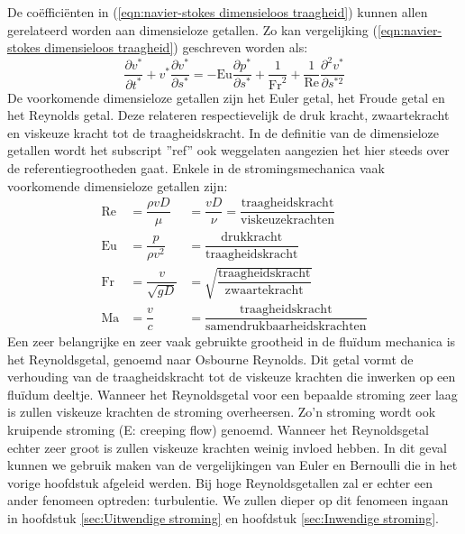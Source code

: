 De coëfficiënten in (\ref{eqn:navier-stokes dimensieloos traagheid}) kunnen allen gerelateerd worden aan dimensieloze getallen. Zo kan vergelijking (\ref{eqn:navier-stokes dimensieloos traagheid}) geschreven worden als:
\begin{equation}
	\frac{\partial v^*}{\partial t^*} + v^* \frac{\partial v^*}{\partial s^*} =  -\text{Eu} \frac{\partial p^*}{\partial s^*} + \frac{1}{\text{Fr}^2} + \frac{1}{\text{Re}} \frac{\partial^2 v^*}{\partial s^{*2}}
	\label{eqn:navier-stokes dimensieloze getallen}
\end{equation}
De voorkomende dimensieloze getallen zijn het Euler getal, het Froude getal en het Reynolds getal. Deze relateren respectievelijk de druk kracht, zwaartekracht en viskeuze kracht tot de traagheidskracht. In de definitie van de dimensieloze getallen wordt het subscript ''ref'' ook weggelaten aangezien het hier steeds over de referentiegrootheden gaat. Enkele in de stromingsmechanica vaak voorkomende dimensieloze getallen zijn:
\begin{align}
	\mathrm{Re} &= \dfrac{\rho v D}{\mu} &= \dfrac{v D}{\nu} = \dfrac{\mathrm{traagheidskracht}}{\mathrm{viskeuze krachten}} \label{eqn:Reynolds} \\
	\mathrm{Eu} &= \dfrac{p}{\rho v^2}   &= \dfrac{\mathrm{drukkracht}}{\mathrm{traagheidskracht}} \label{eqn:Euler} \\
	\mathrm{Fr} &= \dfrac{v}{\sqrt{g D}} &= \sqrt{\dfrac{\mathrm{traagheidskracht}}{\mathrm{zwaartekracht}}} \\
	\mathrm{Ma} &= \dfrac{v}{c}          &= \dfrac{\mathrm{traagheidskracht}}{\mathrm{samendrukbaarheidskrachten}}
	\label{eqn:Dimensieloze getallen}
\end{align}
Een zeer belangrijke en zeer vaak gebruikte grootheid in de fluïdum mechanica is het Reynoldsgetal, genoemd naar Osbourne Reynolds. Dit getal vormt de verhouding van de traagheidskracht tot de viskeuze krachten die inwerken op een fluïdum deeltje. Wanneer het Reynoldsgetal voor een bepaalde stroming zeer laag is zullen viskeuze krachten de stroming overheersen. Zo'n stroming wordt ook kruipende stroming (E: creeping flow) genoemd. Wanneer het Reynoldsgetal echter zeer groot is zullen viskeuze krachten weinig invloed hebben. In dit geval kunnen we gebruik maken van de vergelijkingen van Euler en Bernoulli die in het vorige hoofdstuk afgeleid werden. Bij hoge Reynoldsgetallen zal er echter een ander fenomeen optreden: turbulentie. We zullen dieper op dit fenomeen ingaan in hoofdstuk \ref{sec:Uitwendige stroming} en hoofdstuk \ref{sec:Inwendige stroming}.

